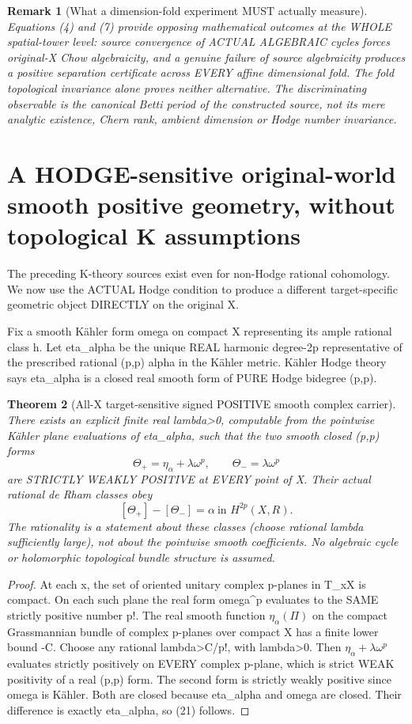 \documentclass[11pt]{article}
\newtheorem{theorem}{Theorem}[section]
\newtheorem{remark}[theorem]{Remark}
\begin{document}
\begin{remark}[What a dimension-fold experiment MUST actually measure]
Equations (4) and (7)
provide opposing
mathematical outcomes
at the WHOLE spatial-tower
level: source convergence
of ACTUAL ALGEBRAIC cycles
forces original-X Chow
algebraicity, and a
genuine failure of source
algebraicity produces
a positive separation
certificate across EVERY
affine dimensional fold.
The fold topological
invariance alone proves
neither alternative.
The discriminating
observable is the
canonical Betti period
of the constructed
source, not its mere
analytic existence,
Chern rank, ambient
dimension or Hodge
number invariance.
\end{remark}

\section{A HODGE-sensitive original-world smooth positive geometry, without topological K assumptions}
The preceding K-theory sources
exist even for non-Hodge
rational cohomology.
We now use the ACTUAL
Hodge condition to produce
a different target-specific
geometric object DIRECTLY
on the original X.

Fix a smooth Kähler form
omega on compact X
representing its ample
rational class h.
Let eta_alpha be the
unique REAL harmonic
degree-2p representative
of the prescribed rational
(p,p) alpha in the
Kähler metric. Kähler
Hodge theory says eta_alpha
is a closed real smooth
form of PURE Hodge
bidegree (p,p).

\begin{theorem}[All-X target-sensitive signed POSITIVE smooth complex carrier]
There exists an explicit
finite real lambda>0,
computable from the
pointwise Kähler plane
evaluations of eta_alpha,
such that the two smooth
closed (p,p) forms
\[
 \boxed{
 \Theta_+=\eta_\alpha+
                    \lambda\omega^p,\qquad
 \Theta_-=\lambda\omega^p
 }                                                     \tag{20}
\]
are STRICTLY WEAKLY
POSITIVE at EVERY point
of X. Their actual
rational de Rham classes
obey
\[
 \boxed{
 [\Theta_+]-[\Theta_-]
     =\alpha\ \text{in }H^{2p}(X,R).
 }                                                     \tag{21}
\]
The rationality is a
statement about these
classes (choose rational
lambda sufficiently large),
not about the pointwise
smooth coefficients.
No algebraic cycle or
holomorphic topological
bundle structure is assumed.
\end{theorem}
\begin{proof}
At each x, the set of
oriented unitary complex
p-planes in T_xX is
compact. On each such
plane the real form
omega^p evaluates
to the SAME strictly
positive number p!.
The real smooth function
$\eta_\alpha(\Pi)$ on
the compact Grassmannian
bundle of complex p-planes
over compact X has a
finite lower bound -C.
Choose any rational
lambda>C/p!, with
lambda>0. Then
$\eta_\alpha+
 \lambda\omega^p$
evaluates strictly
positively on EVERY
complex p-plane, which
is strict WEAK positivity
of a real (p,p) form.
The second form is
strictly weakly positive
since omega is Kähler.
Both are closed
because eta_alpha and
omega are closed.
Their difference is
exactly eta_alpha,
so (21) follows.
\end{proof}
\end{document}
